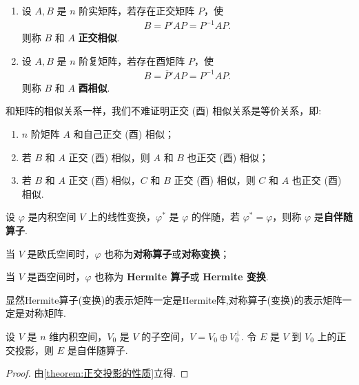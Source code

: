 \documentclass[../../main.tex]{subfiles}%
\begin{document}
\begin{definition}[正交相似和酉相似]
\begin{enumerate}
\item 设 $A,B$ 是 $n$ 阶实矩阵，若存在正交矩阵 $P$，使 
\begin{align*}
B = P'AP=P^{-1}AP.
\end{align*}
则称 $B$ 和 $A$ \textbf{正交相似}. 

\item 设 $A,B$ 是 $n$ 阶复矩阵，若存在酉矩阵 $P$，使 
\begin{align*}
B = \overline{P}'AP=P^{-1}AP.
\end{align*}
则称 $B$ 和 $A$ \textbf{酉相似}.
\end{enumerate}
\end{definition}
\begin{remark}
和矩阵的相似关系一样，我们不难证明正交 (酉) 相似关系是等价关系，即:
\begin{enumerate}
\item $n$ 阶矩阵 $A$ 和自己正交 (酉) 相似；

\item 若 $B$ 和 $A$ 正交 (酉) 相似，则 $A$ 和 $B$ 也正交 (酉) 相似；

\item 若 $B$ 和 $A$ 正交 (酉) 相似，$C$ 和 $B$ 正交 (酉) 相似，则 $C$ 和 $A$ 也正交 (酉) 相似. 
\end{enumerate}
\end{remark}

\begin{definition}[自伴随算子]
设 $\varphi$ 是内积空间 $V$ 上的线性变换，$\varphi^*$ 是 $\varphi$ 的伴随，若 $\varphi^* = \varphi$，则称 $\varphi$ 是\textbf{自伴随算子}. 

当 $V$ 是欧氏空间时，$\varphi$ 也称为\textbf{对称算子}或\textbf{对称变换}；

当 $V$ 是酉空间时，$\varphi$ 也称为 \textbf{Hermite 算子}或 \textbf{Hermite 变换}.
\end{definition}
\begin{remark}
显然Hermite算子(变换)的表示矩阵一定是Hermite阵,对称算子(变换)的表示矩阵一定是对称矩阵.
\end{remark}

\begin{proposition}
设 $V$ 是 $n$ 维内积空间，$V_0$ 是 $V$ 的子空间，$V = V_0 \oplus V_0^\perp$. 令 $E$ 是 $V$ 到 $V_0$ 上的正交投影，则 $E$ 是自伴随算子. 
\end{proposition}
\begin{proof}
由\cref{theorem:正交投影的性质}立得.
\end{proof}
\end{document}
